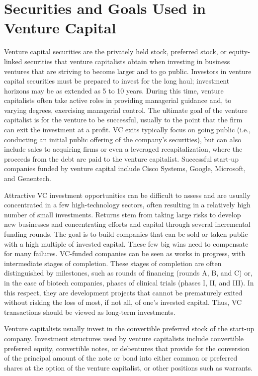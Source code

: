 \documentclass[11pt]{article}
\begin{document}
\section*{Securities and Goals Used in Venture Capital}
Venture capital securities are the privately held stock, preferred stock, or equity-linked securities that venture capitalists obtain when investing in business ventures that are striving to become larger and to go public. Investors in venture capital securities must be prepared to invest for the long haul; investment horizons may be as extended as 5 to 10 years. During this time, venture capitalists often take active roles in providing managerial guidance and, to varying degrees, exercising managerial control. The ultimate goal of the venture capitalist is for the venture to be successful, usually to the point that the firm can exit the investment at a profit. VC exits typically focus on going public (i.e., conducting an initial public offering of the company's securities), but can also include sales to acquiring firms or even a leveraged recapitalization, where the proceeds from the debt are paid to the venture capitalist. Successful start-up companies funded by venture capital include Cisco Systems, Google, Microsoft, and Genentech.

Attractive VC investment opportunities can be difficult to assess and are usually concentrated in a few high-technology sectors, often resulting in a relatively high number of small investments. Returns stem from taking large risks to develop new businesses and concentrating efforts and capital through several incremental funding rounds. The goal is to build companies that can be sold or taken public with a high multiple of invested capital. These few big wins need to compensate for many failures. VC-funded companies can be seen as works in progress, with intermediate stages of completion. These stages of completion are often distinguished by milestones, such as rounds of financing (rounds A, B, and C) or, in the case of biotech companies, phases of clinical trials (phases I, II, and III). In this respect, they are development projects that cannot be prematurely exited without risking the loss of most, if not all, of one's invested capital. Thus, VC transactions should be viewed as long-term investments.

Venture capitalists usually invest in the convertible preferred stock of the start-up company. Investment structures used by venture capitalists include convertible preferred equity, convertible notes, or debentures that provide for the conversion of the principal amount of the note or bond into either common or preferred shares at the option of the venture capitalist, or other positions such as warrants.
\end{document}
